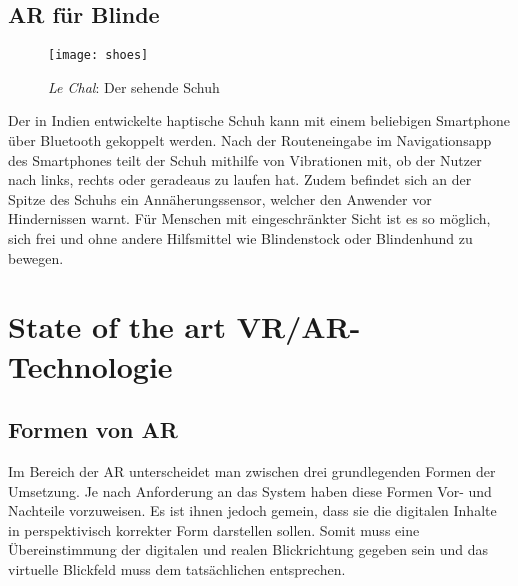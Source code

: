 \section{AR für Blinde}\label{s.shoes}
\begin{wrapfigure}{r}{0.5\textwidth}
	\vspace{-65pt}
	\begin{center}
		\texttt{[image: shoes]}
	\end{center}
	\vspace{-15pt}
	\captionsetup{width=0.42\textwidth}
	\caption{\textit{Le Chal}: Der sehende Schuh}\label{shoes}
	\vspace{-10pt}
\end{wrapfigure}
Der in Indien entwickelte haptische Schuh kann mit einem beliebigen Smartphone über Bluetooth gekoppelt werden. Nach der Routeneingabe im Navigationsapp des Smartphones teilt der Schuh mithilfe von Vibrationen mit, ob der Nutzer nach links, rechts oder geradeaus zu laufen hat. Zudem befindet sich an der Spitze des Schuhs ein Annäherungssensor, welcher den Anwender vor Hindernissen warnt. Für Menschen mit eingeschränkter Sicht ist es so möglich, sich frei und ohne andere Hilfsmittel wie Blindenstock oder Blindenhund zu bewegen.\cite{website:shoes}

\chapter{State of the art VR/AR-Technologie}\label{c.hardware}
\vspace{-20pt}
\section{Formen von AR}\label{s.formen}
Im Bereich der AR unterscheidet man zwischen drei grundlegenden Formen der Umsetzung. Je nach Anforderung an das System haben diese Formen Vor- und Nachteile vorzuweisen. Es ist ihnen jedoch gemein, dass sie die digitalen Inhalte in perspektivisch korrekter Form darstellen sollen. Somit muss eine Übereinstimmung der digitalen und realen Blickrichtung gegeben sein und das virtuelle Blickfeld muss dem tatsächlichen entsprechen.\cite[S.~247]{doerner13}
